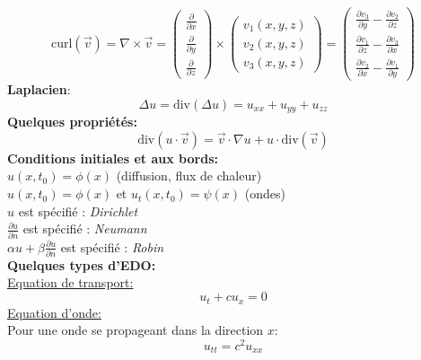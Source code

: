 \begin{equation*}
    \text{curl}(\overrightarrow{v}) = \nabla \times \overrightarrow{v} =
    \begin{pmatrix}
        \frac{\partial}{\partial x} \\
        \frac{\partial}{\partial y} \\
        \frac{\partial}{\partial z}
    \end{pmatrix}
    \times
    \begin{pmatrix}
        v_1(x,y,z) \\
        v_2(x,y,z) \\
        v_3(x,y,z)
    \end{pmatrix}
    =
    \begin{pmatrix}
        \frac{\partial v_3}{\partial y} - \frac{\partial v_2}{\partial z} \\
        \frac{\partial v_1}{\partial z} - \frac{\partial v_3}{\partial x} \\
        \frac{\partial v_2}{\partial x} - \frac{\partial v_1}{\partial y}
    \end{pmatrix}
\end{equation*}
\textbf{Laplacien}:
\begin{equation*}
    \Delta u=\text{div}(\Delta u)=u_{xx}+u_{yy}+u_{zz}
\end{equation*}
\textbf{Quelques propriétés:}
\begin{equation*}
    \text{div}(u\cdot \overrightarrow{v})=\overrightarrow{v}\cdot\nabla u+u\cdot\text{div}(\overrightarrow{v})
\end{equation*}
\textbf{Conditions initiales et aux bords:}\\
$u(x,t_0)=\phi(x)$ (diffusion, flux de chaleur)\\
$u(x,t_0)=\phi(x)$ et $u_t(x,t_0)=\psi(x)$ (ondes)\\
$u$ est spécifié : \textit{Dirichlet}\\
$\frac{\partial u}{\partial n}$ est spécifié : \textit{Neumann}\\
$\alpha u+\beta\frac{\partial u}{\partial n}$ est spécifié : \textit{Robin}\\
\textbf{Quelques types d'EDO:}\\
\underline{Equation de transport:}
\begin{equation*}
    u_t+cu_x=0
\end{equation*}
\underline{Equation d'onde:}\\
Pour une onde se propageant dans la direction $x$:
\begin{equation*}
    u_{tt}=c^2u_{xx}
\end{equation*}\\
